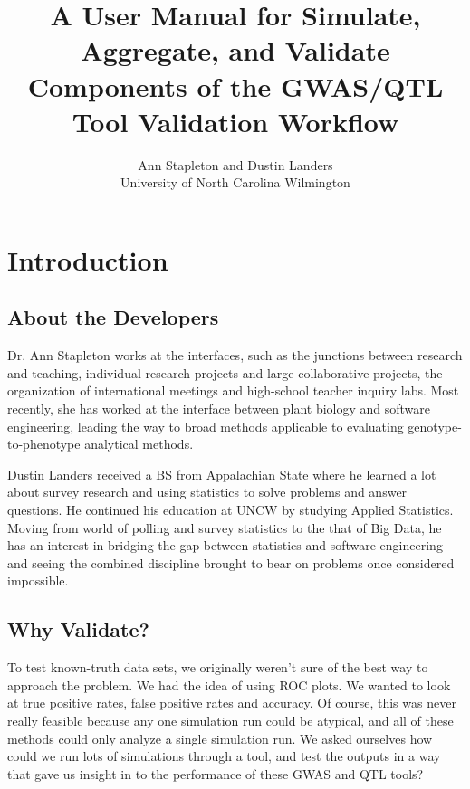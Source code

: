 \documentclass[twoside,a4paper]{refart}
\title{A User Manual for Simulate, Aggregate, and Validate Components of the GWAS/QTL Tool Validation Workflow}
\author{Ann Stapleton and Dustin Landers \\
University of North Carolina Wilmington \\
}
\date{}
\begin{document}
\maketitle

\tableofcontents

\newpage



\section{Introduction}

\subsection{About the Developers}

Dr. Ann Stapleton works at the interfaces, such as the junctions between research and teaching, individual research projects and large collaborative projects, the organization of international meetings and high-school teacher inquiry labs. Most recently, she has worked at the interface between plant biology and software engineering, leading the way to broad methods applicable to evaluating genotype-to-phenotype analytical methods.

Dustin Landers received a BS from Appalachian State where he learned a lot about survey research and using statistics to solve problems and answer questions. He continued his education at UNCW by studying Applied Statistics. Moving from world of polling and survey statistics to the that of Big Data, he has an interest in bridging the gap between statistics and software engineering and seeing the combined discipline brought to bear on problems once considered impossible.


\subsection{Why Validate?}

To test known-truth data sets, we originally weren't sure of the best way to approach the problem. We had the idea of using ROC plots. We wanted to look at true positive rates, false positive rates and accuracy. Of course, this was never really feasible because any one simulation run could be atypical, and all of these methods could only analyze a single simulation run. We asked ourselves how could we run lots of simulations through a tool, and test the outputs in a way that gave us insight in to the performance of these GWAS and QTL tools?
\end{document}
